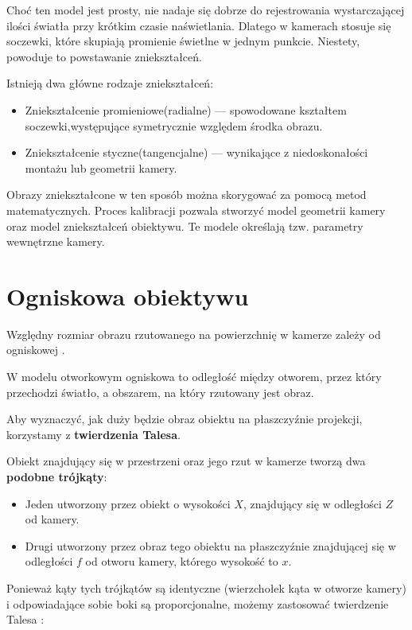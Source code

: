 \documentclass[magisterska]{pracadypl}
\begin{document}
Choć ten model jest prosty, nie nadaje się dobrze do rejestrowania wystarczającej ilości światła przy krótkim czasie naświetlania. Dlatego w kamerach stosuje się soczewki, które skupiają promienie świetlne w jednym punkcie. Niestety, powoduje to powstawanie zniekształceń.

Istnieją dwa główne rodzaje zniekształceń:

\begin{itemize}
  \item Zniekształcenie promieniowe(radialne) — spowodowane kształtem soczewki,występujące symetrycznie względem środka obrazu.

  \item Zniekształcenie styczne(tangencjalne) — wynikające z niedoskonałości montażu lub geometrii kamery.
\end{itemize}

Obrazy zniekształcone w ten sposób można skorygować za pomocą metod matematycznych. Proces kalibracji pozwala stworzyć model geometrii kamery oraz model zniekształceń obiektywu. Te modele określają tzw. parametry wewnętrzne kamery.

\section{Ogniskowa obiektywu}

Względny rozmiar obrazu rzutowanego na powierzchnię w kamerze zależy od ogniskowej \cite{ogniskowa}.

W modelu otworkowym ogniskowa to odległość między otworem, przez który przechodzi światło, a obszarem, na który rzutowany jest obraz.

Aby wyznaczyć, jak duży będzie obraz obiektu na płaszczyźnie projekcji, korzystamy z \textbf{twierdzenia Talesa}.  

Obiekt znajdujący się w przestrzeni oraz jego rzut w kamerze tworzą dwa \textbf{podobne trójkąty}:
\begin{itemize}
    \item Jeden utworzony przez obiekt o wysokości \( X \), znajdujący się w odległości \( Z \) od kamery.
    \item Drugi utworzony przez obraz tego obiektu na płaszczyźnie znajdującej się w odległości \( f \) od otworu kamery, którego wysokość to \( x \).
\end{itemize}

Ponieważ kąty tych trójkątów są identyczne (wierzchołek kąta w otworze kamery) i odpowiadające sobie boki są proporcjonalne, możemy zastosować twierdzenie Talesa \cite{tales}:
\end{document}
